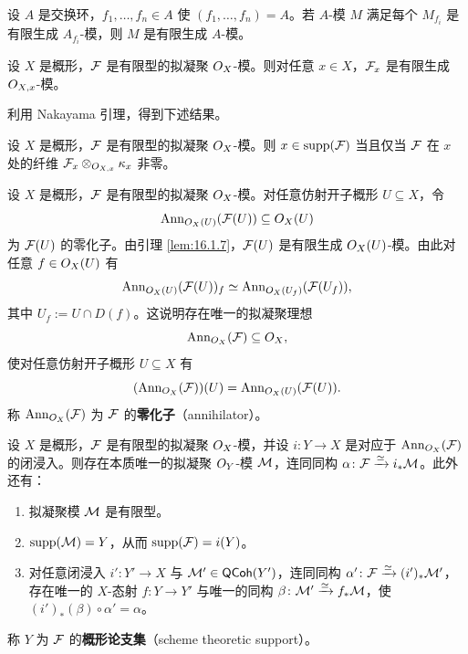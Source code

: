 \begin{exercise}\label{exc:16.1.8}
设 $A$ 是交换环，$f_1,\dots,f_n\in A$ 使 $(f_1,\dots,f_n)=A$。若 $A$-模 $M$ 满足每个 $M_{f_i}$ 是有限生成 $A_{f_i}$-模，则 $M$ 是有限生成 $A$-模。
\end{exercise}

\begin{corollary}\label{cor:16.1.9}
设 $X$ 是概形，$\mathcal{F}$ 是有限型的拟凝聚 $O_X$-模。则对任意 $x\in X$，$\mathcal{F}_x$ 是有限生成 $O_{X,x}$-模。
\end{corollary}

利用 Nakayama 引理，得到下述结果。

\begin{corollary}\label{cor:16.1.10}
设 $X$ 是概形，$\mathcal{F}$ 是有限型的拟凝聚 $O_X$-模。则 $x\in\mathrm{supp}(\mathcal{F})$ 当且仅当 $\mathcal{F}$ 在 $x$ 处的纤维 $\mathcal{F}_x\otimes_{O_{X,x}}\kappa_x$ 非零。
\end{corollary}

\begin{construction}\label{con:16.1.11}
设 $X$ 是概形，$\mathcal{F}$ 是有限型的拟凝聚 $O_X$-模。对任意仿射开子概形 $U\subseteq X$，令
\[
\mathrm{Ann}_{O_X(U)}(\mathcal{F}(U))\subseteq O_X(U)
\]
为 $\mathcal{F}(U)$ 的零化子。由引理 \ref{lem:16.1.7}，$\mathcal{F}(U)$ 是有限生成 $O_X(U)$-模。由此对任意 $f\in O_X(U)$ 有
\[
\mathrm{Ann}_{O_X(U)}(\mathcal{F}(U))_f \simeq \mathrm{Ann}_{O_X(U_f)}(\mathcal{F}(U_f)),
\]
其中 $U_f:=U\cap D(f)$。这说明存在唯一的拟凝聚理想
\[
\mathrm{Ann}_{O_X}(\mathcal{F})\subseteq O_X,
\]
使对任意仿射开子概形 $U\subseteq X$ 有
\[
(\mathrm{Ann}_{O_X}(\mathcal{F}))(U)=\mathrm{Ann}_{O_X(U)}(\mathcal{F}(U)).
\]
称 $\mathrm{Ann}_{O_X}(\mathcal{F})$ 为 $\mathcal{F}$ 的\textbf{零化子}（annihilator）。
\end{construction}

\begin{proposition}\label{prop:16.1.12}
设 $X$ 是概形，$\mathcal{F}$ 是有限型的拟凝聚 $O_X$-模，并设 $i\colon Y\to X$ 是对应于 $\mathrm{Ann}_{O_X}(\mathcal{F})$ 的闭浸入。则存在本质唯一的拟凝聚 $O_Y$-模 $\mathcal{M}$，连同同构 $\alpha\colon\mathcal{F}\xrightarrow{\simeq}i_*\mathcal{M}$。此外还有：
\begin{enumerate}[label=(\arabic*),leftmargin=2em,itemsep=0.25ex]
\item 拟凝聚模 $\mathcal{M}$ 是有限型。
\item $\mathrm{supp}(\mathcal{M})=Y$，从而 $\mathrm{supp}(\mathcal{F})=i(Y)$。
\item 对任意闭浸入 $i'\colon Y'\to X$ 与 $\mathcal{M}'\in\mathsf{QCoh}(Y')$，连同同构 $\alpha'\colon\mathcal{F}\xrightarrow{\simeq}(i')_*\mathcal{M}'$，存在唯一的 $X$-态射 $f\colon Y\to Y'$ 与唯一的同构 $\beta\colon\mathcal{M}'\xrightarrow{\simeq}f_*\mathcal{M}$，使 $(i')_*(\beta)\circ\alpha'=\alpha$。
\end{enumerate}
称 $Y$ 为 $\mathcal{F}$ 的\textbf{概形论支集}（scheme theoretic support）。
\end{proposition}

